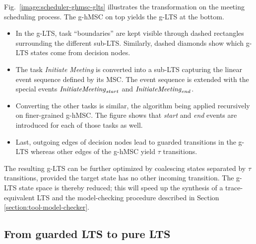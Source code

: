 Fig.~\ref{image:scheduler-ghmsc-glts} illustrates the transformation on the meeting scheduling process. The g-hMSC on top yields the g-LTS at the bottom.
\begin{itemize}
\item In the g-LTS, task ``boundaries'' are kept visible through dashed rectangles surrounding the different sub-LTS.  Similarly, dashed diamonds show which g-LTS states come from decision nodes. 
\item The task \emph{Initiate Meeting} is converted into a sub-LTS capturing the linear event sequence defined by its MSC. The event sequence is extended with the special events $\mbox{\emph{InitiateMeeting}}_{start}$ and $\mbox{\emph{InitiateMeeting}}_{end}$.
\item Converting the other tasks is similar, the algorithm being applied recursively on finer-grained g-hMSC. The figure shows that \emph{start} and \emph{end} events are introduced for each of those tasks as well. 
\item Last, outgoing edges of decision nodes lead to guarded transitions in the g-LTS whereas other edges of the g-hMSC yield $\tau$ transitions.
\end{itemize}

The resulting g-LTS can be further optimized by coalescing states separated by $\tau$ transitions, provided the target state has no other incoming transition. The g-LTS state space is thereby reduced; this will speed up the synthesis of a trace-equivalent LTS and the model-checking procedure described in Section \ref{section:tool-model-checker}. 


\subsection{From guarded LTS to pure LTS\label{subsection:from-glts-to-lts}}

